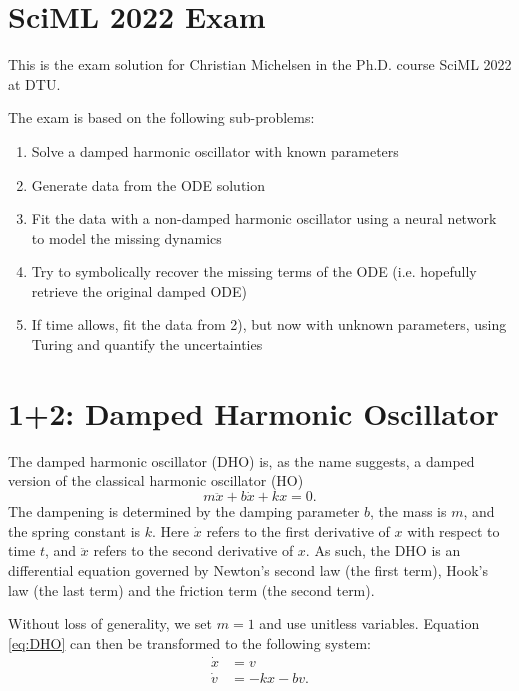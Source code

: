 \documentclass[a4paper]{article}
\begin{document}
\section*{SciML 2022 Exam}

This is the exam solution for Christian Michelsen in the Ph.D. course SciML 2022 at DTU.

\vspace{1cm}

\noindent The exam is based on the following sub-problems:
\begin{enumerate}
    \item Solve a damped harmonic oscillator with known parameters
    \item Generate data from the ODE solution
    \item Fit the data with a non-damped harmonic oscillator using a neural network to model the missing dynamics
    \item Try to symbolically recover the missing terms of the ODE (i.e. hopefully retrieve the original damped ODE)
    \item If time allows, fit the data from 2), but now with unknown parameters, using Turing and quantify the uncertainties
\end{enumerate}

\clearpage
\section*{1+2: Damped Harmonic Oscillator}

The damped harmonic oscillator (DHO) is, as the name suggests, a damped version of the classical harmonic oscillator (HO)
\begin{equation}
    m \ddot{x} + b\dot{x} + kx = 0.
    \label{eq:DHO}
\end{equation}
The dampening is determined by the damping parameter $b$, the mass is $m$, and the spring constant is $k$.
Here $\dot{x}$ refers to the first derivative of $x$ with respect to time $t$, and $\ddot{x}$ refers to the second derivative of $x$.
As such, the DHO is an differential equation governed by Newton's second law (the first term),
Hook's law (the last term) and the friction term (the second term).

Without loss of generality, we set $m=1$ and use unitless variables.
Equation \eqref{eq:DHO} can then be transformed to the following system:
\begin{equation}
    \begin{split}
        \dot{x} &= v \\
        \dot{v} &= -kx - bv.
    \end{split}
    \label{eq:DHO_2D}
\end{equation}
\end{document}

